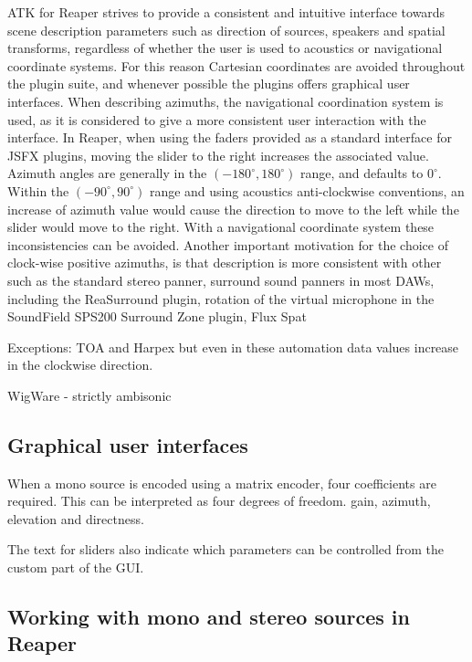 \documentclass{article}
\begin{document}
ATK for Reaper strives to provide a consistent and intuitive interface towards scene description parameters such as direction of sources, speakers and spatial transforms, regardless of whether the user is used to acoustics or navigational coordinate systems.
For this reason Cartesian coordinates are avoided throughout the plugin suite, and whenever possible the plugins offers graphical user interfaces.
When describing azimuths, the navigational coordination system is used, as it is considered to give a more consistent user interaction with the interface.
In Reaper, when using the faders provided as a standard interface for JSFX plugins, moving the slider to the right increases the associated value.
Azimuth angles are generally in the $(-180^{\circ}, 180^{\circ})$ range, and defaults to $0^{\circ}$. 
Within the $(-90^{\circ}, 90^{\circ})$ range and using acoustics anti-clockwise conventions, an increase of azimuth value would cause the direction to move to the left while the slider would move to the right.
With a navigational coordinate system these inconsistencies can be avoided.
Another important motivation for the choice of clock-wise positive azimuths, is that description is more consistent with other 
such as the standard stereo panner, surround sound panners in most DAWs, including the ReaSurround plugin, 
rotation of the virtual microphone in the SoundField SPS200 Surround Zone plugin, 
Flux Spat

Exceptions: TOA and Harpex
but even in these automation data values increase in the clockwise direction.


WigWare - strictly ambisonic

\subsection{Graphical user interfaces}

When a mono source is encoded using a matrix encoder, four coefficients are required. This can be interpreted as four degrees of freedom. gain, azimuth, elevation and directness.


The text for sliders also indicate which parameters can be controlled from the custom part of the GUI.



\subsection{Working with mono and stereo sources in Reaper}


\end{document}
